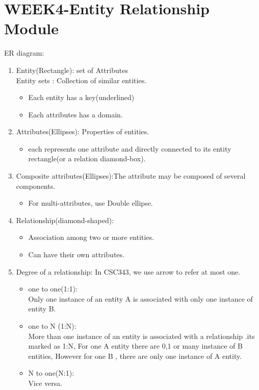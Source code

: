 \pagebreak
\section{WEEK4-Entity Relationship Module}
ER diagram:
\begin{enumerate}
    \item Entity(Rectangle): set of Attributes\\Entity sets : Collection of similar entities.\begin{itemize}
        \item Each entity has a key(underlined)
        \item Each attributes has a domain.
    \end{itemize}
    \item Attributes(Ellipses): Properties of entities.\begin{itemize}
        \item each represents one attribute and directly connected to its entity rectangle(or a relation diamond-box).
    \end{itemize} 
    \item Composite attributes(Ellipses):The attribute may be composed of several
components.\begin{itemize}
    \item For multi-attributes, use Double ellipse.
\end{itemize}
    \item Relationship(diamond-shaped):\begin{itemize}
        \item Association among two or more entities.
        \item Can have their own attributes.
    \end{itemize}
    \item Degree of a relationship: In CSC343, we use arrow to refer at most one.
    \begin{itemize}
        \item one to one(1:1): \\Only one instance of an entity A is associated with only one instance of entity B.
        \item one to N (1:N): \\More than one instance of an entity is associated with a relationship .its marked as 1:N, For one A entity there are 0,1 or many instance of B entities, However for one  B , there are only one instance of A entity.
        \item N to one(N:1): \\Vice versa.

\end{itemize}
\end{enumerate}

